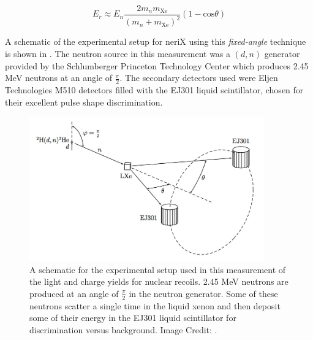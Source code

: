 \begin{equation}
        \label{eqn:nerix_energy_scattering_angle}
        E_r \approx E_n \frac{2 m_n m_{\textrm{Xe}}}{(m_n + m_{\textrm{Xe}})^2}(1 - \textrm{cos} \theta)
\end{equation}

A schematic of the experimental setup for neriX using this \textit{fixed-angle} technique is shown in .  The neutron source in this measurement was a $(d, n)$ generator provided by the Schlumberger Princeton Technology Center which produces 2.45 MeV neutrons at an angle of $\frac{\pi}{2}$.  The secondary detectors used were Eljen Technologies M510 detectors filled with the EJ301 liquid scintillator, chosen for their excellent pulse shape discrimination.  


\begin{figure}[t]
        \centering
	\includegraphics[width=0.9\textwidth]{nerix_expt_schematic}
	\caption{A schematic for the experimental setup used in this measurement of the light and charge yields for nuclear recoils.  2.45 MeV neutrons are produced at an angle of $\frac{\pi}{2}$ in the neutron generator.  Some of these neutrons scatter a single time in the liquid xenon and then deposit some of their energy in the EJ301 liquid scintillator for discrimination versus background.  Image Credit: .}
	\label{fig:nerix_expt_schematic}
\end{figure}


